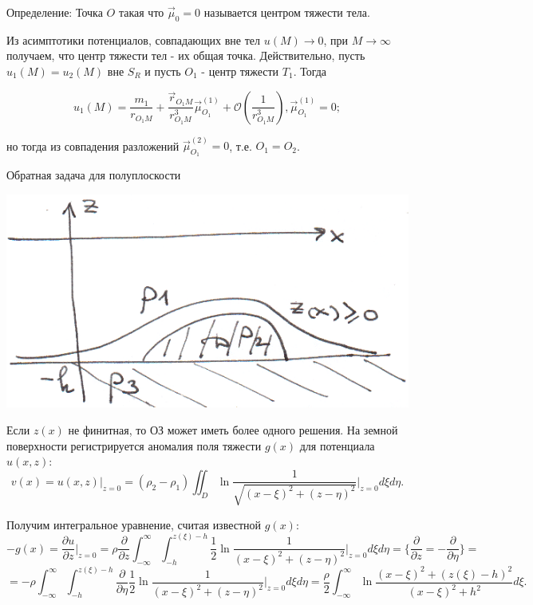 \documentclass{article}
\begin{document}
Определение: Точка $O$ такая что $\overrightarrow{\mu}_0 = 0$ называется центром тяжести тела.

Из асимптотики  потенциалов, совпадающих вне тел $u(M) \to 0$, при $M \to \infty$ получаем, что центр тяжести тел - их общая точка. Действительно, пусть $u_1(M) = u_2(M)$ вне $S_R$ и пусть $O_1$ - центр тяжести $T_1$. Тогда

\[
u_1(M) = \dfrac{m_1}{r_{O_1M}} + \dfrac{\overrightarrow{r}_{O_1M}}{r_{O_1M}^3} \overrightarrow{\mu}_{O_1}^{(1)} + \mathcal{O}(\dfrac{1}{r_{O_1M}^3}), 
\overrightarrow{\mu}_{O_1}^{(1)} = 0;
\]

но тогда из совпадения разложений $ \overrightarrow{\mu}_{O_1
}^{(2)} = 0 $, т.е. $ O_1 = O_2 $.


\vspace{1cm}
\centerline{\large Обратная задача для полуплоскости}

\vspace{0.5cm}
\includegraphics[scale=0.85]{pic3_2.png}

Если $z(x)$ не финитная, то ОЗ может иметь более одного решения.
На земной поверхности регистрируется аномалия поля тяжести $g(x)$ для потенциала $u(x,z)$:
\[
v(x) = u(x,z) \bigg|_{z = 0} = (\rho_2 - \rho_1) \iint_D \ln \dfrac{1}{\sqrt{(x-\xi)^2 + (z - \eta)^2}} \bigg|_{z=0} d\xi d\eta.
\]

Получим интегральное уравнение, считая известной $g(x)$:
\[
-g(x) = \dfrac{\partial u}{\partial z} \bigg|_{z = 0} = \rho \dfrac{\partial}{\partial z} \int_{-\infty}^{\infty} \int_{-h}^{z(\xi)-h} \dfrac{1}{2} \ln \dfrac{1}{(x-\xi)^2 + (z - \eta)^2} \bigg|_{z=0} d\xi d\eta = \{ \dfrac{\partial}{\partial z} =
 - \dfrac{\partial}{\partial \eta} \} =
\]
\[
= -\rho \int_{-\infty}^{\infty} \int_{-h}^{z(\xi)-h} \dfrac{\partial}{\partial \eta} \dfrac{1}{2} \ln \dfrac{1}{(x-\xi)^2 + (z - \eta)^2} \bigg|_{z=0} d\xi d\eta =
 \dfrac{\rho}{2} \int_{-\infty}^{\infty} \ln \dfrac{(x-\xi)^2 + (z(\xi) - h)^2}{(x-\xi)^2 + h^2} d\xi.
\]
\end{document}
